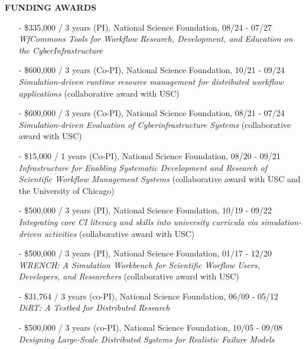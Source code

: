 \documentclass[times,11pt]{letter}
\begin{document}
\noindent
{\large{\bf FUNDING AWARDS}}
\begin{itemize}

\item[-] \$335,000 / 3 years (PI), National Science Foundation, 08/24 - 07/27~\\
	{\it WfCommons Tools for Workflow Research, Development, and Education on the CyberInfrastructure}

\item[-] \$600,000 / 3 years (Co-PI), National Science Foundation, 10/21 - 09/24~\\
    {\it Simulation-driven runtime resource management for distributed workflow applications} (collaborative award with USC)


\item[-] \$600,000 / 3 years (Co-PI), National Science Foundation, 08/21 - 07/24~\\
    {\it Simulation-driven Evaluation of Cyberinfrastructure Systems} (collaborative award with USC)


\item[-] \$15,000 / 1 years (Co-PI), National Science Foundation, 08/20 - 09/21~\\
    {\it  Infrastructure for Enabling Systematic Development and Research of Scientific Workflow Management Systems} (collaborative award with USC and the University of Chicago)

\item[-] \$500,000 / 3 years (PI), National Science Foundation, 10/19 - 09/22~\\
    {\it Integrating core CI literacy and skills into university curricula via simulation-driven activities} (collaborative award with USC)


\item[-] \$500,000 / 3 years (PI), National Science Foundation, 01/17 - 12/20~\\
    {\it WRENCH: A Simulation Workbench for Scientific Worflow Users, Developers, and Researchers} (collaborative award with USC)

\item[-] \$31,764 / 3 years (co-PI), National Science Foundation, 06/09 - 05/12~\\
{\it DiRT: A Testbed for Distributed Research}

\item[-] \$500,000 / 3 years (co-PI), National Science Foundation, 10/05 - 09/08~\\
{\it Designing Large-Scale Distributed Systems for Realistic Failure Models}


\end{itemize}
\end{document}
